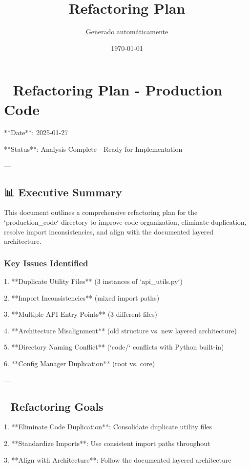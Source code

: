 \documentclass[11pt,a4paper]{article}
\title{Refactoring Plan}
\author{Generado automáticamente}
\date{\today}
\begin{document}
\maketitle

\tableofcontents
\newpage

\section{🔄 Refactoring Plan - Production Code}

**Date**: 2025-01-27  

**Status**: Analysis Complete - Ready for Implementation

---

\subsection{📊 Executive Summary}

This document outlines a comprehensive refactoring plan for the `production\_code` directory to improve code organization, eliminate duplication, resolve import inconsistencies, and align with the documented layered architecture.

\subsubsection{Key Issues Identified}

1. **Duplicate Utility Files** (3 instances of `api\_utils.py`)

2. **Import Inconsistencies** (mixed import paths)

3. **Multiple API Entry Points** (3 different files)

4. **Architecture Misalignment** (old structure vs. new layered architecture)

5. **Directory Naming Conflict** (`code/` conflicts with Python built-in)

6. **Config Manager Duplication** (root vs. core)

---

\subsection{🎯 Refactoring Goals}

1. **Eliminate Code Duplication**: Consolidate duplicate utility files

2. **Standardize Imports**: Use consistent import paths throughout

3. **Align with Architecture**: Follow the documented layered architecture
\end{document}
